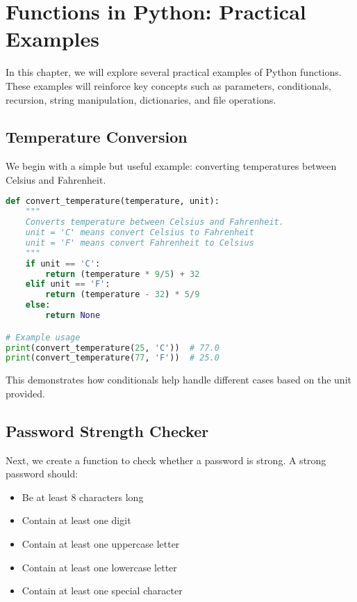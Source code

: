 \chapter{Functions in Python: Practical Examples}

In this chapter, we will explore several practical examples of Python functions. These examples will reinforce key concepts such as parameters, conditionals, recursion, string manipulation, dictionaries, and file operations.

\section{Temperature Conversion}

We begin with a simple but useful example: converting temperatures between Celsius and Fahrenheit.

\begin{lstlisting}[language=Python, caption={Temperature conversion function}]
def convert_temperature(temperature, unit):
    """
    Converts temperature between Celsius and Fahrenheit.
    unit = 'C' means convert Celsius to Fahrenheit
    unit = 'F' means convert Fahrenheit to Celsius
    """
    if unit == 'C':
        return (temperature * 9/5) + 32
    elif unit == 'F':
        return (temperature - 32) * 5/9
    else:
        return None

# Example usage
print(convert_temperature(25, 'C'))  # 77.0
print(convert_temperature(77, 'F'))  # 25.0
\end{lstlisting}

This demonstrates how conditionals help handle different cases based on the unit provided.

\section{Password Strength Checker}

Next, we create a function to check whether a password is strong. A strong password should:
\begin{itemize}
    \item Be at least 8 characters long
    \item Contain at least one digit
    \item Contain at least one uppercase letter
    \item Contain at least one lowercase letter
    \item Contain at least one special character
\end{itemize}

